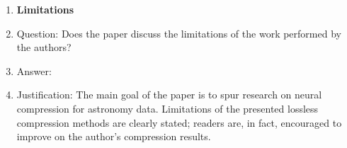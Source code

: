 \begin{enumerate}
\item {\bf Limitations}
    \item[] Question: Does the paper discuss the limitations of the work performed by the authors?
    \item[] Answer: \answerYes{}{} %
    \item[] Justification: The main goal of the paper is to spur research on neural compression for astronomy data. Limitations of the presented lossless compression methods are clearly stated; readers are, in fact, encouraged to improve on the author's compression results. 


\end{enumerate}
